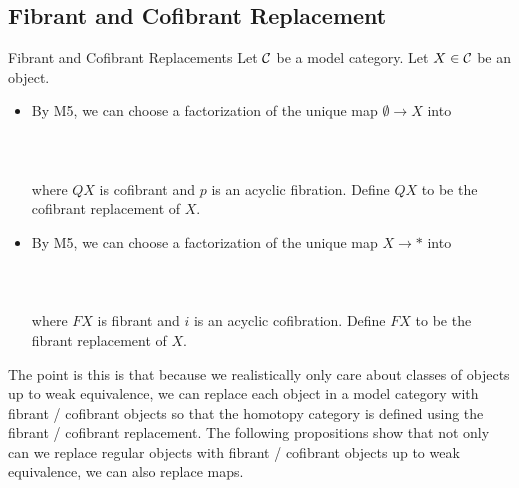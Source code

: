 \documentclass[a4paper]{article}
\begin{document}
\subsection{Fibrant and Cofibrant Replacement}
\begin{defn}{Fibrant and Cofibrant Replacements}{} Let $\mathcal{C}$ be a model category. Let $X\in\mathcal{C}$ be an object. 
\begin{itemize}
\item By M5, we can choose a factorization of the unique map $\emptyset\to X$ into \\~\\
\\~\\ 
where $QX$ is cofibrant and $p$ is an acyclic fibration. Define $QX$ to be the cofibrant replacement of $X$. 
\item By M5, we can choose a factorization of the unique map $X\to\ast$ into \\~\\
\\~\\ 
where $FX$ is fibrant and $i$ is an acyclic cofibration. Define $FX$ to be the fibrant replacement of $X$. 
\end{itemize}
\end{defn}

The point is this is that because we realistically only care about classes of objects up to weak equivalence, we can replace each object in a model category with fibrant / cofibrant objects so that the homotopy category is defined using the fibrant / cofibrant replacement. The following propositions show that not only can we replace regular objects with fibrant / cofibrant objects up to weak equivalence, we can also replace maps. 
\end{document}
